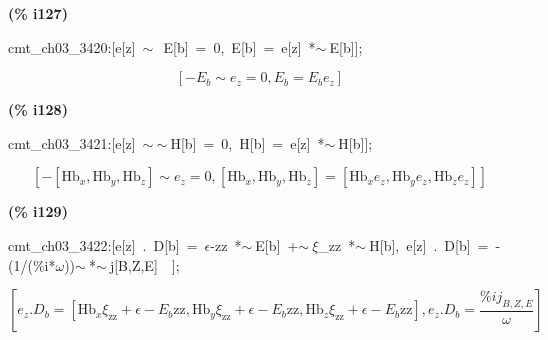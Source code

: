 \documentclass[fleqn]{article}
\begin{document}
\noindent
\begin{minipage}[t]{4.000000em}\color{red}\bfseries
(\% i127)	
\end{minipage}
\begin{minipage}[t]{\textwidth}\color{blue}
cmt\_ch03\_3420:[e[z]\ \ensuremath{\sim\ }\ E[b]\ =\ 0,\ E[b]\ =\ e[z]\ *\ensuremath{\sim\ }E[b]];
\end{minipage}
\[\displaystyle \tag{cmt\_ ch03\_ 3420} 
\left[ -{E_b}\operatorname{\sim  }{e_z}=0\operatorname{,}{E_b}={E_b} {e_z}\right] \mbox{}
\]


\noindent
\begin{minipage}[t]{4.000000em}\color{red}\bfseries
(\% i128)	
\end{minipage}
\begin{minipage}[t]{\textwidth}\color{blue}
cmt\_ch03\_3421:[e[z]\ \ensuremath{\sim\ }\ensuremath{\sim\ }H[b]\ =\ 0,\ H[b]\ =\ e[z]\ *\ensuremath{\sim\ }H[b]];
\end{minipage}
\[\displaystyle \tag{cmt\_ ch03\_ 3421} 
\left[ -\left[ {{\ensuremath{\mathrm{Hb}}}_x}\operatorname{,}{{\ensuremath{\mathrm{Hb}}}_y}\operatorname{,}{{\ensuremath{\mathrm{Hb}}}_z}\right] \operatorname{\sim  }{e_z}=0\operatorname{,}\left[ {{\ensuremath{\mathrm{Hb}}}_x}\operatorname{,}{{\ensuremath{\mathrm{Hb}}}_y}\operatorname{,}{{\ensuremath{\mathrm{Hb}}}_z}\right] =\left[ {{\ensuremath{\mathrm{Hb}}}_x} {e_z}\operatorname{,}{{\ensuremath{\mathrm{Hb}}}_y} {e_z}\operatorname{,}{{\ensuremath{\mathrm{Hb}}}_z} {e_z}\right] \right] \mbox{}
\]


\noindent
\begin{minipage}[t]{4.000000em}\color{red}\bfseries
(\% i129)	
\end{minipage}
\begin{minipage}[t]{\textwidth}\color{blue}
cmt\_ch03\_3422:[e[z]\ .\ D[b]\ =\ \ensuremath{\epsilon}-zz\ *\ensuremath{\sim\ }E[b]\ +\ensuremath{\sim\ }\ensuremath{\xi}\_zz\ *\ensuremath{\sim\ }H[b],\ e[z]\ .\ D[b]\ =\ -(1/(\%i*\ensuremath{\omega}))\ensuremath{\sim\ }*\ensuremath{\sim\ }j[B,Z,E]\ \ ];
\end{minipage}
\[\displaystyle \tag{cmt\_ ch03\_ 3422} 
\left[ {e_z}\ensuremath{\mathrm{ . }}{D_b}=\left[ {{\ensuremath{\mathrm{Hb}}}_x} {{\xi }_{\ensuremath{\mathrm{zz}}}}+\epsilon -{E_b} \ensuremath{\mathrm{zz}}\operatorname{,}{{\ensuremath{\mathrm{Hb}}}_y} {{\xi }_{\ensuremath{\mathrm{zz}}}}+\epsilon -{E_b} \ensuremath{\mathrm{zz}}\operatorname{,}{{\ensuremath{\mathrm{Hb}}}_z} {{\xi }_{\ensuremath{\mathrm{zz}}}}+\epsilon -{E_b} \ensuremath{\mathrm{zz}}\right] \operatorname{,}{e_z}\ensuremath{\mathrm{ . }}{D_b}=\frac{\% i {j_{B,Z,E}}}{\omega }\right] \mbox{}
\]
\end{document}
